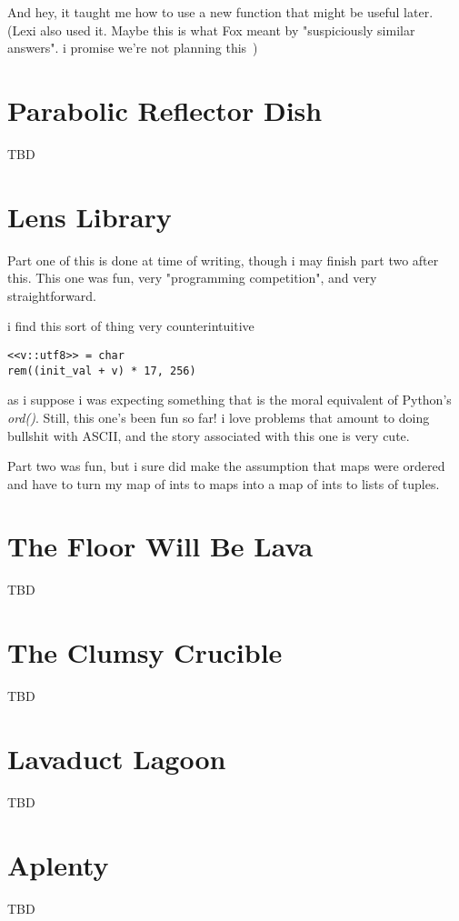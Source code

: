 \documentclass{article}
\begin{document}
And hey, it taught me how to use a new function that might be useful later. (Lexi also used it. Maybe this is what Fox meant by "suspiciously similar answers". i promise we're not planning this~)

\section{Parabolic Reflector Dish}
TBD

\section{Lens Library}
Part one of this is done at time of writing, though i may finish part two after this. This one was fun, very "programming competition", and very straightforward.

i find this sort of thing very counterintuitive
\begin{verbatim}
<<v::utf8>> = char
rem((init_val + v) * 17, 256)
\end{verbatim}

as i suppose i was expecting something that is the moral equivalent of Python's \textit{ord()}. Still, this one's been fun so far! i love problems that amount to doing bullshit with ASCII, and the story associated with this one is very cute. 

Part two was fun, but i sure did make the assumption that maps were ordered and have to turn my map of ints to maps into a map of ints to lists of tuples.
 

\section{The Floor Will Be Lava}
TBD

\section{The Clumsy Crucible}
TBD

\section{Lavaduct Lagoon}
TBD

\section{Aplenty}
TBD
\end{document}
